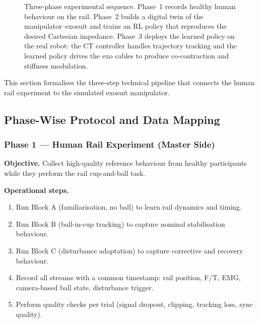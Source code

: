 \documentclass[11pt, a4paper]{article}
\begin{document}
\begin{figure}[H]
\caption{Three-phase experimental sequence. Phase~1 records healthy human behaviour on the rail. Phase~2 builds a digital twin of the manipulator--exosuit and trains an RL policy that reproduces the desired Cartesian impedance. Phase~3 deploys the learned policy on the real robot: the CT controller handles trajectory tracking and the learned policy drives the exo cables to produce co-contraction and stiffness modulation.}
\label{fig:three-phase}
\end{figure}

\bigskip
This section formalises the three-step technical pipeline that connects
the human rail experiment to the simulated exosuit manipulator.

\subsection{Phase-Wise Protocol and Data Mapping}
\label{sec:phasewise-transfer}

\subsubsection{Phase 1 --- Human Rail Experiment (Master Side)}
\textbf{Objective.} Collect high-quality reference behaviour from healthy participants while they perform the rail cup-and-ball task.

\textbf{Operational steps.}
\begin{enumerate}[nosep]
  \item Run Block A (familiarisation, no ball) to learn rail dynamics and timing.
  \item Run Block B (ball-in-cup tracking) to capture nominal stabilisation behaviour.
  \item Run Block C (disturbance adaptation) to capture corrective and recovery behaviour.
  \item Record all streams with a common timestamp: rail position, F/T, EMG, camera-based ball state, disturbance trigger.
  \item Perform quality checks per trial (signal dropout, clipping, tracking loss, sync quality).
\end{enumerate}
\end{document}
